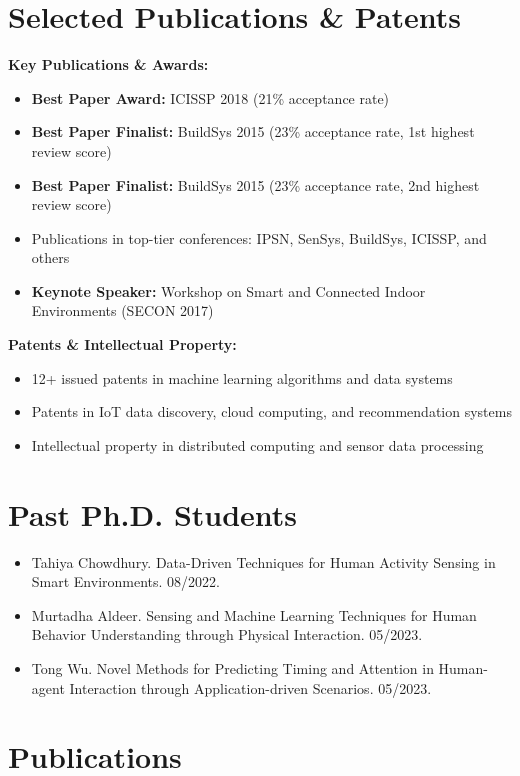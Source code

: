 \documentclass[12pt]{article}
\begin{document}
\section{Selected Publications \& Patents}
\textbf{Key Publications \& Awards:}
\begin{itemize}
    \item \textbf{Best Paper Award:} ICISSP 2018 (21\% acceptance rate)
    \item \textbf{Best Paper Finalist:} BuildSys 2015 (23\% acceptance rate, 1st highest review score)
    \item \textbf{Best Paper Finalist:} BuildSys 2015 (23\% acceptance rate, 2nd highest review score)
    \item Publications in top-tier conferences: IPSN, SenSys, BuildSys, ICISSP, and others
    \item \textbf{Keynote Speaker:} Workshop on Smart and Connected Indoor Environments (SECON 2017)
\end{itemize}

\textbf{Patents \& Intellectual Property:}
\begin{itemize}
    \item 12+ issued patents in machine learning algorithms and data systems
    \item Patents in IoT data discovery, cloud computing, and recommendation systems
    \item Intellectual property in distributed computing and sensor data processing
\end{itemize}

\section{Past Ph.D. Students}
\begin{itemize}
    \item Tahiya Chowdhury. Data-Driven Techniques for Human Activity Sensing in Smart Environments. 08/2022.
    \item Murtadha Aldeer. Sensing and Machine Learning Techniques for Human Behavior Understanding through Physical Interaction. 05/2023.
    \item Tong Wu. Novel Methods for Predicting Timing and Attention in Human-agent Interaction through Application-driven Scenarios. 05/2023.
\end{itemize}



\section{Publications}

\end{document}
